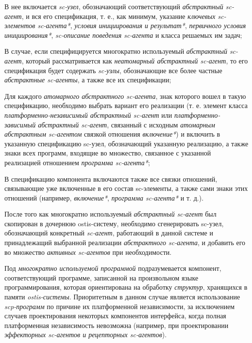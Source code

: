 \begin{textitemize}
    \item В нее включается \textit{sc-узел}, обозначающий соответствующий \textit{абстрактный sc-агент}, и вся его спецификация, т. е., как минимум, указание \textit{ключевых sc-элементов sc-агента*}, \textit{условия инициирования и результат*}, \textit{первичного условия инициирования*}, \textit{sc-описание поведения sc-агента} и класса решаемых им задач;
    \item В случае, если специфицируется многократно используемый \textit{абстрактный sc-агент}, который рассматривается как \textit{неатомарный абстрактный sc-агент}, то его спецификация  будет содержать \textit{sc-узлы}, обозначающие все более частные \textit{абстрактные sc-агенты}, а также все их спецификации;
    \item Для каждого \textit{атомарного абстрактного sc-агента}, знак которого вошел в такую спецификацию, необходимо выбрать вариант его реализации (т. е. элемент класса \textit{платформенно-независимый абстрактный sc-агент} или \textit{платформенно-зависимый абстрактный sc-агент}, связанный с исходным \textit{атомарным абстрактным sc-агентом} связкой отношения \textit{включение*}) и включить в указанную спецификацию sc-узел, обозначающий указанную реализацию, а также знаки всех программ, входящие во множество, связанное с указанной реализацией отношением \textit{программа sc-агента*};
    \item В спецификацию компонента включаются также все связки отношений, связывающие уже включенные в его состав sc-элементы, а также сами знаки этих отношений (например, \textit{включение*}, \textit{программа sc-агента*} и т. д.).
\end{textitemize}

После того как многократно используемый \textit{абстрактный sc-агент} был скопирован в дочернюю ostis-систему, необходимо сгенерировать sc-узел, обозначающий конкретный \textit{sc-агент}, работающий в данной системе и принадлежащий выбранной реализации \textit{абстрактного sc-агента}, и добавить его во множество \textit{активных sc-агентов} при необходимости.

Под \textit{многократно используемой программой} подразумевается компонент, соответствующий программе, записанной на произвольном языке программирования, которая ориентирована на обработку \textit{структур}, хранящихся в памяти \textit{ostis-системы}. Приоритетным в данном случае является использование \textit{scp-программ} по причине их платформенной независимости, за исключением случаев проектирования некоторых компонентов интерфейса, когда полная платформенная независимость невозможна (например, при проектировании \textit{эффекторных sc-агентов и рецепторных sc-агентов}).

